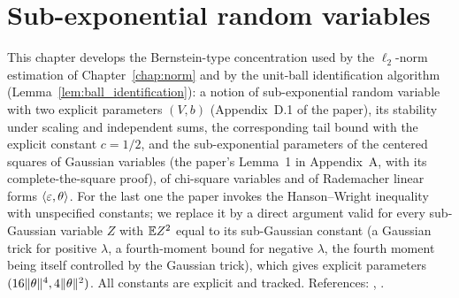 \chapter{Sub-exponential random variables}
\label{chap:pre_subexp}

This chapter develops the Bernstein-type concentration used by the $\ell_2$-norm estimation
of Chapter~\ref{chap:norm} and by the unit-ball identification algorithm
(Lemma~\ref{lem:ball_identification}): a notion of sub-exponential random variable with two
explicit parameters $(V, b)$ (Appendix~D.1 of the paper), its stability under scaling and
independent sums, the corresponding tail bound with the explicit constant $c = 1/2$, and the
sub-exponential parameters of the centered squares of Gaussian variables (the paper's
Lemma~1 in Appendix~A, with its complete-the-square proof), of chi-square variables and of
Rademacher linear forms $\langle \varepsilon, \theta \rangle$. For the last one the paper invokes the
Hanson--Wright inequality with unspecified constants; we replace it by a direct argument valid
for every sub-Gaussian variable $Z$ with $\mathbb{E} Z^2$ equal to its sub-Gaussian constant (a Gaussian
trick for positive $\lambda$, a fourth-moment bound for negative $\lambda$, the fourth moment
being itself controlled by the Gaussian trick), which gives explicit parameters
$(16\lVert \theta \rVert^4, 4\lVert \theta \rVert^2)$. All constants are explicit and tracked. References:
\cite[Section~2.7]{vershynin2018high}, \cite[Section~2.4]{boucheron2013concentration}.

